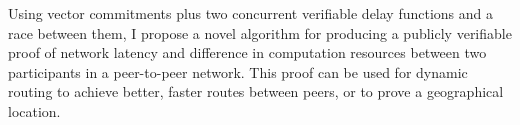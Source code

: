 Using vector commitments plus two concurrent verifiable delay functions and a race between them, I propose a novel algorithm for producing a publicly verifiable proof of network latency and difference in computation resources between two participants in a peer-to-peer network. This proof can be used for dynamic routing to achieve better, faster routes between peers, or to prove a geographical location.
